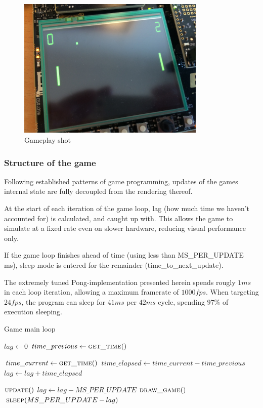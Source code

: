 \begin{figure}[H]
\centering
\includegraphics[width=0.8\textwidth]{figures/gameplay.jpg}
\caption{Gameplay shot}

\end{figure}

\subsubsection{Structure of the game}

Following established patterns of game programming, updates of the games
internal state are fully decoupled from the rendering thereof.

At the start of each iteration of the game loop, lag (how much time we haven't
accounted for) is calculated, and caught up with.
This allows the game to simulate at a fixed rate even on slower hardware,
reducing visual performance only.

If the game loop finishes ahead of time (using less than MS\_PER\_UPDATE ms),
sleep mode is entered for the remainder (time\_to\_next\_update).

The extremely tuned Pong-implementation presented herein spends rougly $ 1 ms $
in each loop iteration, allowing a maximum framerate of $ 1000 fps $.
When targeting $ 24 fps $, the program can sleep for $ 41 ms $ per $ 42 ms $ cycle,
spending $ 97 \% $ of execution sleeping.

\begin{algorithm}
  \caption{Game main loop}
  \begin{algorithmic}
    \State $lag \gets 0$
    \State $time\_previous \gets \Call{get\_time}{\null}$

    \Loop
      \State $time\_current \gets \Call{get\_time}{\null}$
      \State $time\_elapsed \gets time\_current - time\_previous$
      \State $lag \gets lag + time\_elapsed$

        \State $\Call{update}{\null}$
        \State $lag \gets lag - MS\_PER\_UPDATE$
      \EndWhile
      \State $\Call{draw\_game}{\null}$
      \State $\Call{sleep}{MS\_PER\_UPDATE - lag}$
    \EndLoop
  \end{algorithmic}
\end{algorithm}

